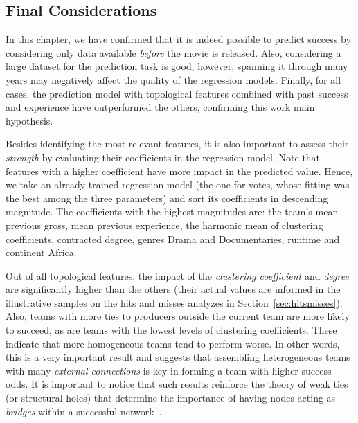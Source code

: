 \subsection{Final Considerations}
\label{sec:an:final}
In this chapter, we have confirmed that it is indeed possible to predict
success by considering only data available \textit{before} the movie is
released. Also, considering a large dataset for the prediction task is good;
however, spanning it through many years may negatively affect the quality of
the regression models. Finally, for all cases, the prediction model with
topological features combined with past success and experience have
outperformed the others, confirming this work main hypothesis.

Besides identifying the most relevant features, it is also important to assess
their \textit{strength} by evaluating their coefficients in the regression
model. Note that features with a higher coefficient have more impact in the
predicted value. Hence, we take an already trained regression model (the one
for votes, whose fitting was the best among the three parameters) and sort its
coefficients in descending magnitude. The coefficients with the highest
magnitudes are: the team's mean previous gross, mean previous experience, the
harmonic mean of clustering coefficients, contracted degree, genres Drama and
Documentaries, runtime and continent Africa. 

Out of all topological features, the impact of the \textit{clustering
coefficient} and \textit{degree} are significantly higher than the others
(their actual values are informed in the illustrative samples on the hits and
misses analyzes in Section~\ref{sec:hitsmisses}). Also, teams with more ties to
producers outside the current team are more likely to succeed, as are teams
with the lowest levels of clustering coefficients. These indicate that more
homogeneous teams tend to perform worse. In other words, this is a very
important result and suggests that assembling heterogeneous teams with many
\textit{external connections} is key in forming a team with higher success
odds. It is important to notice that such results reinforce the theory of weak
ties (or structural holes) that determine the importance of having nodes acting
as \textit{bridges} within a successful
network~\citep{Burt04,burt2005brokerage,newman2001structure}.
